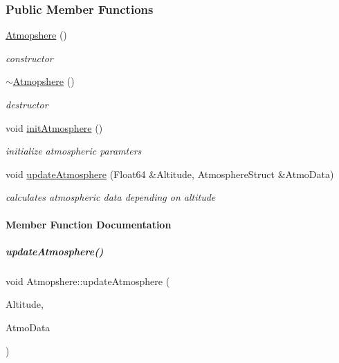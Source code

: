 \subsubsection*{Public Member Functions}
\begin{DoxyCompactItemize}
\item 
\mbox{\label{group___atmosphere_a77ca553d3c4e855dd921a451d65cc313}} 
\hyperlink{group___atmosphere_a77ca553d3c4e855dd921a451d65cc313}{Atmopshere} ()
\begin{DoxyCompactList}\small\item\em constructor \end{DoxyCompactList}\item 
\mbox{\label{group___atmosphere_ac7815ca8008ed54dc758f2bf7a6104f7}} 
\hyperlink{group___atmosphere_ac7815ca8008ed54dc758f2bf7a6104f7}{$\sim$\+Atmopshere} ()
\begin{DoxyCompactList}\small\item\em destructor \end{DoxyCompactList}\item 
\mbox{\label{group___atmosphere_a6e1d5763fbb6631784c99ee3c88911bd}} 
void \hyperlink{group___atmosphere_a6e1d5763fbb6631784c99ee3c88911bd}{init\+Atmosphere} ()
\begin{DoxyCompactList}\small\item\em initialize atmospheric paramters \end{DoxyCompactList}\item 
void \hyperlink{group___atmosphere_a2bd97471d32725d6196ee6816ea36c99}{update\+Atmosphere} (Float64 \&Altitude, Atmosphere\+Struct \&Atmo\+Data)
\begin{DoxyCompactList}\small\item\em calculates atmospheric data depending on altitude \end{DoxyCompactList}\end{DoxyCompactItemize}


\paragraph{Member Function Documentation}
\mbox{\label{group___atmosphere_a2bd97471d32725d6196ee6816ea36c99}} 
\subparagraph{\texorpdfstring{update\+Atmosphere()}{updateAtmosphere()}}
{\footnotesize\ttfamily void Atmopshere\+::update\+Atmosphere (\begin{DoxyParamCaption}\item[{Float64 \&}]{Altitude,  }\item[{Atmosphere\+Struct \&}]{Atmo\+Data }\end{DoxyParamCaption})}




